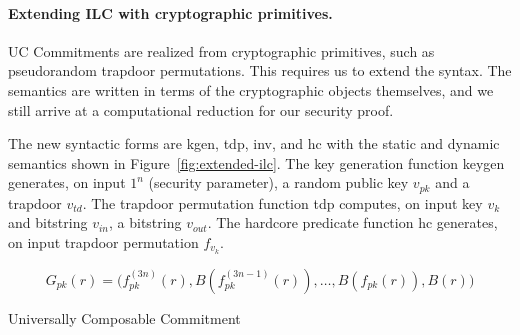 \paragraph{Extending ILC with cryptographic primitives.}
 UC Commitments are realized from
cryptographic primitives, such as pseudorandom trapdoor permutations. This
requires us to extend the syntax. The semantics are written in terms of the
cryptographic objects themselves, and we still arrive at a computational
reduction for our security proof.

The new syntactic forms are \textsf{kgen}, \textsf{tdp}, \textsf{inv}, and
\textsf{hc} with the static and dynamic semantics shown in
Figure~\ref{fig:extended-ilc}. The key generation function \textsf{keygen}
generates, on input $1^n$ (security parameter), a random public key $v_{pk}$ and
a trapdoor $v_{td}$. The trapdoor permutation function \textsf{tdp} computes, on
input key $v_k$ and bitstring $v_{in}$, a bitstring $v_{out}$. The hardcore
predicate function \textsf{hc} generates, on input trapdoor permutation
$f_{v_k}$.



\[ G_{pk}(r) = \big(f_{pk}^{(3n)}(r), B(f_{pk}^{(3n-1)}(r)), \ldots, B(f_{pk}(r)), B(r)\big)\]



\begin{algorithm}
\DontPrintSemicolon

\smallskip
{}
\smallskip

\caption{Universally Composable Commitment}
\label{alg:com}
\end{algorithm}

